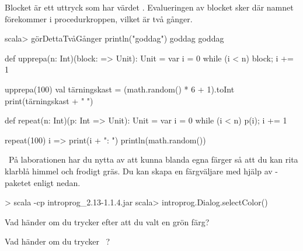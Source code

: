 \SOLUTION

\TaskSolved \what

\SubtaskSolved Blocket är ett uttryck som har värdet . Evalueringen av blocket sker där namnet  förekommer i procedurkroppen, vilket är två gånger.
\begin{REPL}
scala> görDettaTvåGånger { println("goddag") }
goddag
goddag
\end{REPL}

\SubtaskSolved
\begin{Code}
def upprepa(n: Int)(block: => Unit): Unit = {
   var i = 0
   while (i < n) {block; i += 1}
}
\end{Code}

\SubtaskSolved
\begin{Code}
upprepa(100){
  val tärningskast = (math.random() * 6 + 1).toInt
  print(tärningskast + " ")
}
\end{Code}


\SubtaskSolved
\begin{Code}
def repeat(n: Int)(p: Int => Unit): Unit = {
   var i = 0
   while (i < n) {p(i); i += 1}
}
\end{Code}

\SubtaskSolved
\begin{Code}
repeat(100){ i =>
  print(i + ": ")
  println(math.random())
}
\end{Code}



\QUESTEND




\QUESTBEGIN

\Task \what~På laborationen har du nytta av att kunna blanda egna färger så att du kan rita klarblå himmel och frodigt gräs. Du kan skapa en färgväljare med hjälp av -paketet enligt nedan.
\begin{REPL}
> scala -cp introprog_2.13-1.1.4.jar
scala> introprog.Dialog.selectColor()
\end{REPL}

\Subtask Vad händer om du trycker  efter att du valt en grön färg?

\Subtask Vad händer om du trycker ~?

